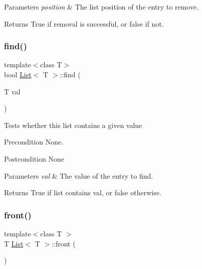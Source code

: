 \begin{DoxyParams}{Parameters}
{\em position} & The list position of the entry to remove. \\
\hline
\end{DoxyParams}
\begin{DoxyReturn}{Returns}
True if removal is successful, or false if not. 
\end{DoxyReturn}
\mbox{\label{class_list_a0b06dd3bed0aea651c190bf14ce76501}} 
\subsubsection{\texorpdfstring{find()}{find()}}
{\footnotesize\ttfamily template$<$class T$>$ \\
bool \hyperlink{class_list}{List}$<$ T $>$\+::find (\begin{DoxyParamCaption}\item[{T}]{val }\end{DoxyParamCaption})}

Tests whether this list contains a given value \begin{DoxyPrecond}{Precondition}
None. 
\end{DoxyPrecond}
\begin{DoxyPostcond}{Postcondition}
None 
\end{DoxyPostcond}

\begin{DoxyParams}{Parameters}
{\em val} & The value of the entry to find. \\
\hline
\end{DoxyParams}
\begin{DoxyReturn}{Returns}
True if list contains val, or false otherwise. 
\end{DoxyReturn}
\mbox{\label{class_list_a2606aeb0b00885fd7b3037a29ae28c8b}} 
\subsubsection{\texorpdfstring{front()}{front()}}
{\footnotesize\ttfamily template$<$class T $>$ \\
T \hyperlink{class_list}{List}$<$ T $>$\+::front (\begin{DoxyParamCaption}{ }\end{DoxyParamCaption})}

